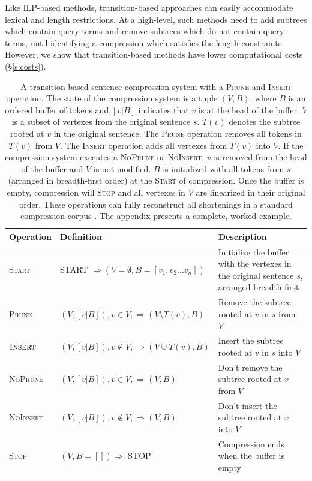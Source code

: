 \documentclass[11pt,a4paper]{article}
\begin{document}
Like ILP-based methods, transition-based approaches can easily accommodate lexical and length restrictions. At a high-level, such methods need to add subtrees which contain query terms and remove subtrees which do not contain query terms, until identifying a compression which satisfies the length constraints. However, we show that transition-based methods have lower computational costs (\S\ref{s:costs}).

\begin{table}[]
\centering
\begin{tabular}{llp{70mm}}
\textbf{Operation} &             \textbf{Definition}                                                    &      \textbf{Description}    \\ \hline
\textsc{Start}      & START $\Rightarrow ( V=\emptyset,  B=[v_1, v_2 ... v_n])$ & Initialize the buffer with the vertexes in the original sentence $s$, arranged breadth-first \\ \hline
\textsc{Prune}              & $(V, [v|B]), v \in V,  \Rightarrow (V \setminus  T(v), B)$ & Remove the subtree rooted at $v$ in $s$ from $V$ \\  
$\textsc{Insert}$             & $(V, [v|B]), v \notin V, \Rightarrow (V \cup T(v), B)$ & Insert the subtree rooted at $v$ in $s$ into $V$  \\ \hline
\textsc{NoPrune}           & $(V, [v|B]), v \in V, \Rightarrow (V, B)$ & Don't remove the subtree rooted at $v$ from $V$  \\ 
\textsc{NoInsert}          &       $(V, [v|B]), v \notin V, \Rightarrow (V, B)$ &   Don't insert the subtree rooted at $v$ into $V$    \\ \hline
\textsc{Stop}             & $ (V, B=[]) \Rightarrow$ STOP & Compression ends when the buffer is empty \\                                               
\end{tabular}
\caption{A transition-based sentence compression system with a \textsc{Prune} and \textsc{Insert} operation. The state of the compression system is a tuple $(V, B)$, where $B$ is an ordered buffer of tokens and $[v|B]$ indicates that $v$ is at the head of the buffer. $V$ is a subset of vertexes from the original sentence $s$. $T(v)$ denotes the subtree rooted at $v$ in the original sentence. The \textsc{Prune} operation removes all tokens in $T(v)$ from $V$. The \textsc{Insert} operation adds all vertexes from $T(v)$ into $V$. If the compression system executes a \textsc{NoPrune} or \textsc{NoInsert}, $v$ is removed from the head of the buffer and $V$ is not modified. $B$ is initialized with all tokens from $s$ (arranged in breadth-first order) at the \textsc{Start} of compression. Once the buffer is empty, compression will \textsc{Stop} and all vertexes in $V$ are linearized in their original order. These operations can fully reconstruct all shortenings in a standard compression corpus \cite{filippova2013overcoming}. The appendix presents a complete, worked example.}
\label{t:ops}
\end{table}
\end{document}

